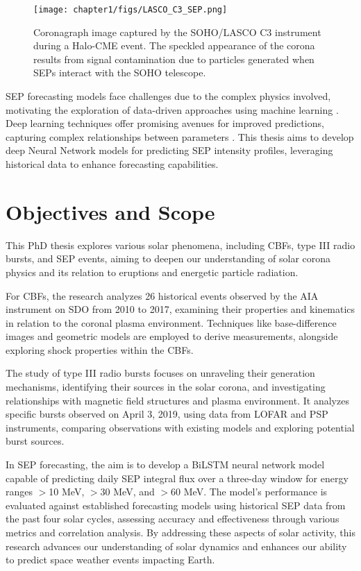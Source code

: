 \begin{figure}[!htp]
	\centerline{\texttt{[image: chapter1/figs/LASCO\_C3\_SEP.png]}}
	\caption{Coronagraph image captured by the SOHO/LASCO C3 instrument during a Halo-CME event. The speckled appearance of the corona results from signal contamination due to particles generated when SEPs interact with the SOHO telescope.}
	\label{fig_lasco_sep}
\end{figure}

SEP forecasting models face challenges due to the complex physics involved, motivating the exploration of data-driven approaches using machine learning \citep{kahler_2007, laitinen_2017}. Deep learning techniques offer promising avenues for improved predictions, capturing complex relationships between parameters \citep{florios_2018, camporeale_2019}. This thesis aims to develop deep Neural Network models for predicting SEP intensity profiles, leveraging historical data to enhance forecasting capabilities.

\section{Objectives and Scope}
This PhD thesis explores various solar phenomena, including CBFs, type III radio bursts, and SEP events, aiming to deepen our understanding of solar corona physics and its relation to eruptions and energetic particle radiation.

For CBFs, the research analyzes 26 historical events observed by the AIA instrument on SDO from 2010 to 2017, examining their properties and kinematics in relation to the coronal plasma environment. Techniques like base-difference images and geometric models are employed to derive measurements, alongside exploring shock properties within the CBFs.

The study of type III radio bursts focuses on unraveling their generation mechanisms, identifying their sources in the solar corona, and investigating relationships with magnetic field structures and plasma environment. It analyzes specific bursts observed on April 3, 2019, using data from LOFAR and PSP instruments, comparing observations with existing models and exploring potential burst sources.

In SEP forecasting, the aim is to develop a BiLSTM neural network model capable of predicting daily SEP integral flux over a three-day window for energy ranges $>$10 MeV, $>$30 MeV, and $>$60 MeV. The model's performance is evaluated against established forecasting models using historical SEP data from the past four solar cycles, assessing accuracy and effectiveness through various metrics and correlation analysis.
By addressing these aspects of solar activity, this research advances our understanding of solar dynamics and enhances our ability to predict space weather events impacting Earth.

